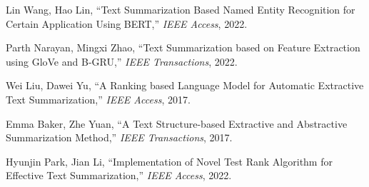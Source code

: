 \documentclass{article}
\begin{document}
\begin{thebibliography}{}
Lin Wang, Hao Lin,
\newblock “Text Summarization Based Named Entity Recognition for Certain Application Using BERT,”
\newblock \emph{IEEE Access}, 2022.

Parth Narayan, Mingxi Zhao,
\newblock “Text Summarization based on Feature Extraction using GloVe and B-GRU,”
\newblock \emph{IEEE Transactions}, 2022.

Wei Liu, Dawei Yu,
\newblock “A Ranking based Language Model for Automatic Extractive Text Summarization,”
\newblock \emph{IEEE Access}, 2017.

Emma Baker, Zhe Yuan,
\newblock “A Text Structure-based Extractive and Abstractive Summarization Method,”
\newblock \emph{IEEE Transactions}, 2017.

Hyunjin Park, Jian Li,
\newblock “Implementation of Novel Test Rank Algorithm for Effective Text Summarization,”
\newblock \emph{IEEE Access}, 2022.

\end{thebibliography}

\clearpage
\end{document}
